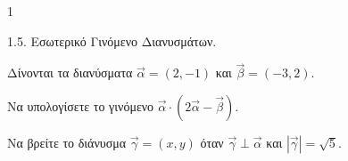 \begin{ylh}{1}
    \item 1.5. Εσωτερικό Γινόμενο Διανυσμάτων.
\end{ylh}
Δίνονται τα διανύσματα $\vec{\alpha} = (2, -1)$ και $\vec{\beta} = (-3, 2)$.
\begin{alist}
\item Να υπολογίσετε το γινόμενο $\vec{\alpha} \cdot (2\vec{\alpha} - \vec{\beta})$.  
\item Να βρείτε το διάνυσμα $\vec{\gamma} = (x, y)$ όταν $\vec{\gamma} \perp \vec{\alpha}$ και $|\vec{\gamma}| = \sqrt{5}$.  
\end{alist}
